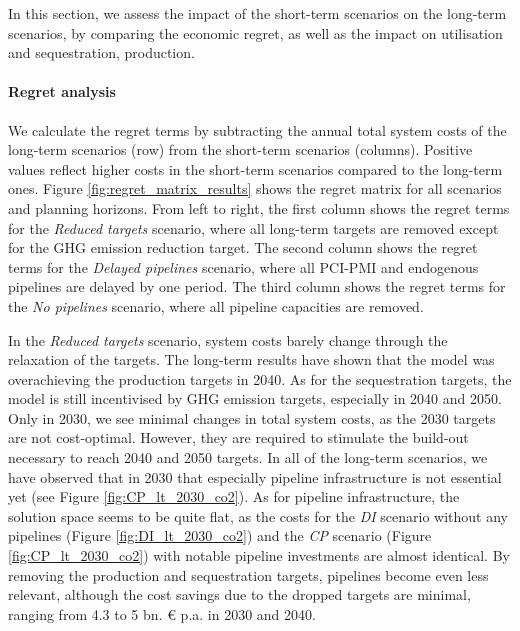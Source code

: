 \documentclass[preprint,12pt,sort&compress]{elsarticle}
\begin{document}
In this section, we assess the impact of the short-term scenarios on the long-term scenarios, by comparing the economic regret, as well as the impact on  utilisation and sequestration,  production. 

\paragraph{Regret analysis}
\label{sec:regret_analysis}
We calculate the regret terms by subtracting the annual total system costs of the long-term scenarios (row) from the short-term scenarios (columns). Positive values reflect higher costs in the short-term scenarios compared to the long-term ones. Figure \ref{fig:regret_matrix_results} shows the regret matrix for all scenarios and planning horizons. From left to right, the first column shows the regret terms for the \textit{Reduced targets} scenario, where all long-term targets are removed except for the GHG emission reduction target. The second column shows the regret terms for the \textit{Delayed pipelines} scenario, where all PCI-PMI and endogenous pipelines are delayed by one period. The third column shows the regret terms for the \textit{No pipelines} scenario, where all pipeline capacities are removed.

In the \textit{Reduced targets} scenario, system costs barely change through the relaxation of the targets. The long-term results have shown that the model was overachieving the  production targets in 2040. As for the  sequestration targets, the model is still incentivised by GHG emission targets, especially in 2040 and 2050. Only in 2030, we see minimal changes in total system costs, as the 2030 targets are not cost-optimal. However, they are required to stimulate the build-out necessary to reach 2040 and 2050 targets. In all of the long-term scenarios, we have observed that in 2030 that especially  pipeline infrastructure is not essential yet (see Figure \ref{fig:CP_lt_2030_co2}). As for  pipeline infrastructure, the solution space seems to be quite flat, as the costs for the \textit{DI} scenario without any pipelines (Figure \ref{fig:DI_lt_2030_co2}) and the \textit{CP} scenario (Figure \ref{fig:CP_lt_2030_co2}) with notable pipeline investments are almost identical. By removing the  production and  sequestration targets, pipelines become even less relevant, although the cost savings due to the dropped targets are minimal, ranging from 4.3 to 5 bn. \euro{} p.a. in 2030 and 2040.
\end{document}
